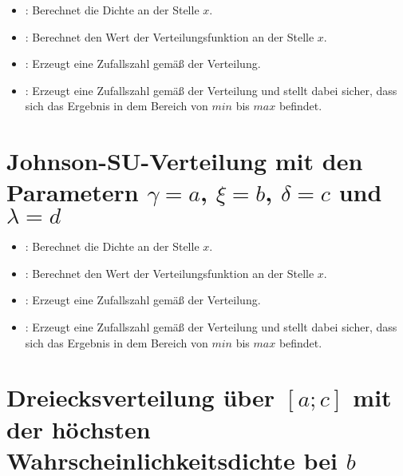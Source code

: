 \begin{itemize}

\item
{}:
Berechnet die Dichte an der Stelle $x$.

\item
{}:
Berechnet den Wert der Verteilungsfunktion an der Stelle $x$.

\item
{}:
Erzeugt eine Zufallszahl gemäß der Verteilung.

\item
{}:
Erzeugt eine Zufallszahl gemäß der Verteilung und stellt dabei sicher, dass sich das Ergebnis in dem Bereich von $min$ bis $max$ befindet.

\end{itemize}



\section{Johnson-SU-Verteilung mit den Parametern \texorpdfstring{$\gamma=a$}{a}, \texorpdfstring{$\xi=b$}{b}, \texorpdfstring{$\delta=c$}{c} und \texorpdfstring{$\lambda=d$}{d}}

\begin{itemize}

\item
{}:
Berechnet die Dichte an der Stelle $x$.

\item
{}:
Berechnet den Wert der Verteilungsfunktion an der Stelle $x$.

\item
{}:
Erzeugt eine Zufallszahl gemäß der Verteilung.  

\item
{}:
Erzeugt eine Zufallszahl gemäß der Verteilung und stellt dabei sicher, dass sich das Ergebnis in dem Bereich von $min$ bis $max$ befindet.

\end{itemize}



\section{Dreiecksverteilung über \texorpdfstring{$[a;c]$}{[a;c]} mit der höchsten Wahrscheinlichkeitsdichte bei \texorpdfstring{$b$}{b}}

